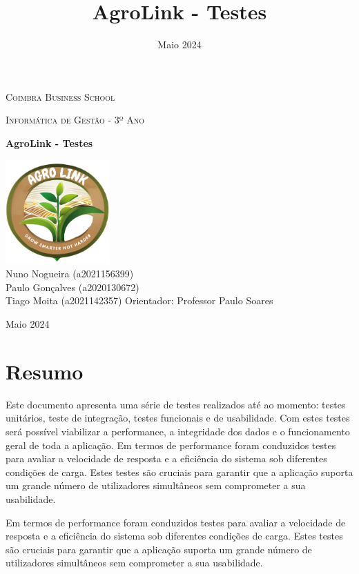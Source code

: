 \documentclass[a4paper,12pt]{report}
\title{AgroLink - Testes}
\author{}
\date{Maio 2024}
\begin{document}
	
	\begin{titlepage}
		\centering
		{\scshape\LARGE Coimbra Business School \par}
		\vspace{1cm}
		{\scshape\Large Informática de Gestão - 3º Ano \par}
		\vspace{1.5cm}
		{\huge\bfseries AgroLink - Testes \par}
		\vspace{2cm}
		\includegraphics[width=0.3\textwidth]{AGROLINK.png} %
		\vspace{3cm}
		\large
		\\Nuno Nogueira (a2021156399)\\
		Paulo Gonçalves (a2020130672)\\
		Tiago Moita (a2021142357)
		\vfill
		Orientador: Professor Paulo Soares \par
		\vfill
		{\large Maio 2024 \par}
	\end{titlepage}
	
	\newpage
	\chapter*{Resumo}
	
	Este documento apresenta uma série de testes realizados até ao momento: testes unitários, teste de integração, testes funcionais e de usabilidade. Com estes testes será possível viabilizar a performance, a integridade dos dados e o funcionamento geral de toda a aplicação. Em termos de performance foram conduzidos testes para avaliar a velocidade de resposta e a eficiência do sistema sob diferentes condições de carga. Estes testes são cruciais para garantir que a aplicação suporta um grande número de utilizadores simultâneos sem comprometer a sua usabilidade.
	
	Em termos de performance foram conduzidos testes para avaliar a velocidade de resposta e a eficiência do sistema sob diferentes condições de carga. Estes testes são cruciais para garantir que a aplicação suporta um grande número de utilizadores simultâneos sem comprometer a sua usabilidade.
	
\end{document}

